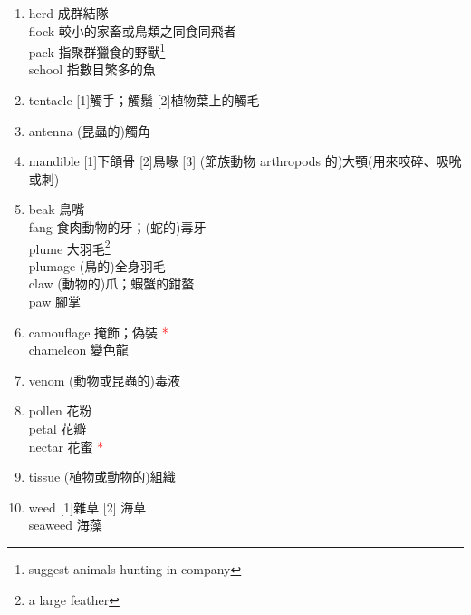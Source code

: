 \documentclass[twoside,b5paper]{book}
\begin{document}
\begin{enumerate}
    \item
      herd 成群結隊\\
      flock 較小的家畜或鳥類之同食同飛者\\
      pack 指聚群獵食的野獸\footnote{suggest animals hunting in company}\\
      school 指數目繁多的魚\\
    \item
      tentacle [1]觸手；觸鬚 [2]植物葉上的觸毛
    \item
      antenna  (昆蟲的)觸角
    \item
      mandible  [1]下頜骨 [2]鳥喙 [3] (節族動物 arthropods 的)大顎(用來咬碎、吸吮或刺)
    \item
      beak  鳥嘴\\
      fang 食肉動物的牙；(蛇的)毒牙\\
      plume  大羽毛\footnote{a large feather}\\
      plumage  (鳥的)全身羽毛\\
      claw  (動物的)爪；蝦蟹的鉗螯\\
      paw  腳掌
    \item
      camouflage  掩飾；偽裝 \textcolor{red}{*}\\
      chameleon  變色龍
    \item
      venom  (動物或昆蟲的)毒液
    \item
      pollen  花粉\\
      petal  花瓣\\
      nectar  花蜜 \textcolor{red}{*}
    \item
      tissue (植物或動物的)組織
    \item
      weed  [1]雜草 [2] 海草\\
      seaweed  海藻

\end{enumerate}
\end{document}

